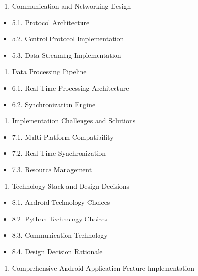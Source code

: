 \documentclass[11pt,a4paper]{report}
\begin{document}
\begin{enumerate}
\item Communication and Networking Design
\end{enumerate}
\begin{itemize}
\item 5.1. Protocol Architecture
\item 5.2. Control Protocol Implementation
\item 5.3. Data Streaming Implementation
\end{itemize}
\begin{enumerate}
\item Data Processing Pipeline
\end{enumerate}
\begin{itemize}
\item 6.1. Real-Time Processing Architecture
\item 6.2. Synchronization Engine
\end{itemize}
\begin{enumerate}
\item Implementation Challenges and Solutions
\end{enumerate}
\begin{itemize}
\item 7.1. Multi-Platform Compatibility
\item 7.2. Real-Time Synchronization
\item 7.3. Resource Management
\end{itemize}
\begin{enumerate}
\item Technology Stack and Design Decisions
\end{enumerate}
\begin{itemize}
\item 8.1. Android Technology Choices
\item 8.2. Python Technology Choices
\item 8.3. Communication Technology
\item 8.4. Design Decision Rationale
\end{itemize}
\begin{enumerate}
\item Comprehensive Android Application Feature Implementation
\end{enumerate}
\end{document}
